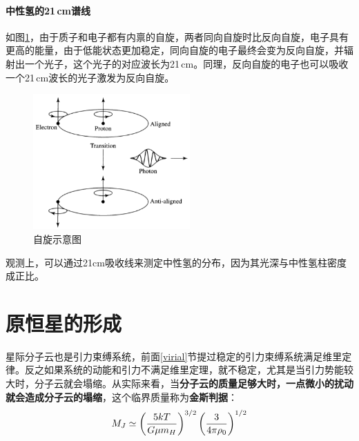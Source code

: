 \documentclass[openany]{ctexbook}
\begin{document}
\paragraph{中性氢的21\,cm谱线}
如图\ref{fig:21cm}，由于质子和电子都有内禀的自旋，两者同向自旋时比反向自旋，电子具有更高的能量，由于低能状态更加稳定，同向自旋的电子最终会变为反向自旋，并辐射出一个光子，这个光子的对应波长为21\,cm。同理，反向自旋的电子也可以吸收一个21\,cm波长的光子激发为反向自旋。

\begin{figure}[hbt]
  \centering
  \includegraphics[width=6cm]{chapters/12/21cm}
  \caption{自旋示意图}
  \label{fig:21cm}
\end{figure}

观测上，可以通过21\;cm吸收线来测定中性氢的分布，因为其光深与中性氢柱密度成正比。

\section{原恒星的形成}
星际分子云也是引力束缚系统，前面\ref{virial}节提过稳定的引力束缚系统满足维里定律。反之如果系统的动能和引力不满足维里定理，就不稳定，尤其是当引力势能较大时，分子云就会塌缩。从实际来看，当\textbf{分子云的质量足够大时，一点微小的扰动就会造成分子云的塌缩}，这个临界质量称为\textbf{金斯判据}：
\begin{equation}
  M_J\simeq\left({5kT\over G\mu m_H}\right)^{3/2}\left({3\over 4\pi \rho_0}\right)^{1/2}
\end{equation}
\end{document}
